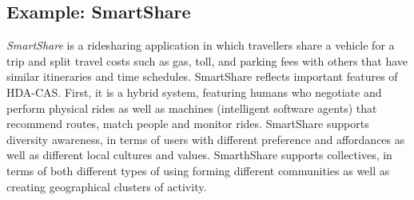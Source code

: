 \subsection{Example: SmartShare}
\textit{SmartShare} is a ridesharing application in which travellers share a vehicle for a trip and split travel costs such as gas, toll, and parking fees with others that have similar itineraries and time schedules. 
SmartShare reflects important features of HDA-CAS. First, it is a hybrid system, featuring humans who negotiate and perform physical rides as well as machines (intelligent software agents) that recommend routes, match people and monitor rides. SmartShare supports diversity awareness, in terms of users with different preference and affordances as well as different local cultures and values. SmarthShare supports collectives, in terms of both different types of using forming different communities as well as creating geographical clusters of activity. 
 


